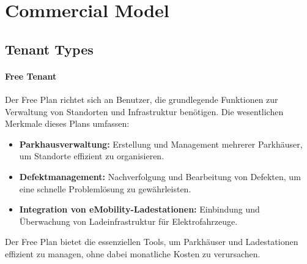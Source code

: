 \section{Commercial Model}
\subsection{Tenant Types}

\paragraph{Free Tenant}
Der Free Plan richtet sich an Benutzer, die grundlegende Funktionen zur Verwaltung von Standorten und Infrastruktur benötigen. Die wesentlichen Merkmale dieses Plans umfassen:
\begin{itemize}
	\item \textbf{Parkhausverwaltung:} Erstellung und Management mehrerer Parkhäuser, um Standorte effizient zu organisieren.
	\item \textbf{Defektmanagement:} Nachverfolgung und Bearbeitung von Defekten, um eine schnelle Problemlösung zu gewährleisten.
	\item \textbf{Integration von eMobility-Ladestationen:} Einbindung und Überwachung von Ladeinfrastruktur für Elektrofahrzeuge.
\end{itemize}
Der Free Plan bietet die essenziellen Tools, um Parkhäuser und Ladestationen effizient zu managen, ohne dabei monatliche Kosten zu verursachen.

